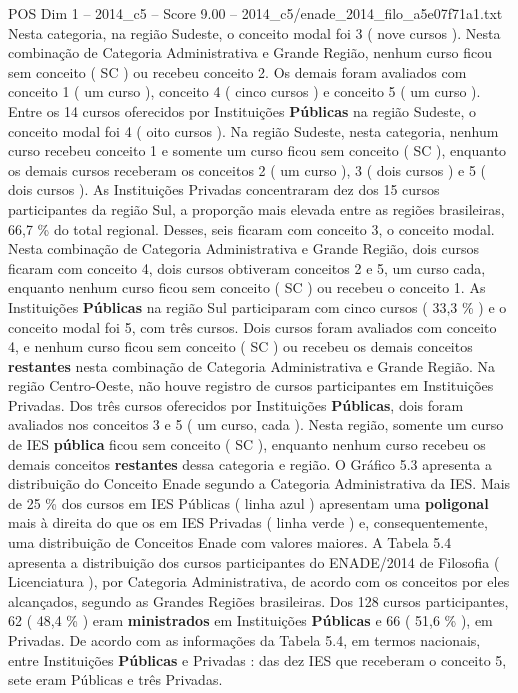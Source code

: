 \begin{textsample}{POS Dim 1 – 2014\_c5 – Score 9.00 – 2014\_c5/enade\_2014\_filo\_a5e07f71a1.txt}
Nesta categoria, na região Sudeste, o conceito modal foi 3 ( nove cursos ).
Nesta combinação de Categoria Administrativa e Grande Região, nenhum curso ficou sem conceito ( SC ) ou recebeu conceito 2.
Os demais foram avaliados com conceito 1 ( um curso ), conceito 4 ( cinco cursos ) e conceito 5 ( um curso ).
Entre os 14 cursos oferecidos por Instituições \textbf{Públicas} na região Sudeste, o conceito modal foi 4 ( oito cursos ).
Na região Sudeste, nesta categoria, nenhum curso recebeu conceito 1 e somente um curso ficou sem conceito ( SC ), enquanto os demais cursos receberam os conceitos 2 ( um curso ), 3 ( dois cursos ) e 5 ( dois cursos ).
As Instituições Privadas concentraram dez dos 15 cursos participantes da região Sul, a proporção mais elevada entre as regiões brasileiras, 66,7 \% do total regional.
Desses, seis ficaram com conceito 3, o conceito modal.
Nesta combinação de Categoria Administrativa e Grande Região, dois cursos ficaram com conceito 4, dois cursos obtiveram conceitos 2 e 5, um curso cada, enquanto nenhum curso ficou sem conceito ( SC ) ou recebeu o conceito 1.
As Instituições \textbf{Públicas} na região Sul participaram com cinco cursos ( 33,3 \% ) e o conceito modal foi 5, com três cursos.
Dois cursos foram avaliados com conceito 4, e nenhum curso ficou sem conceito ( SC ) ou recebeu os demais conceitos \textbf{restantes} nesta combinação de Categoria Administrativa e Grande Região.
Na região Centro-Oeste, não houve registro de cursos participantes em Instituições Privadas.
Dos três cursos oferecidos por Instituições \textbf{Públicas}, dois foram avaliados nos conceitos 3 e 5 ( um curso, cada ).
Nesta região, somente um curso de IES \textbf{pública} ficou sem conceito ( SC ), enquanto nenhum curso recebeu os demais conceitos \textbf{restantes} dessa categoria e região.
O Gráfico 5.3 apresenta a distribuição do Conceito Enade segundo a Categoria Administrativa da IES.
Mais de 25 \% dos cursos em IES Públicas ( linha azul ) apresentam uma \textbf{poligonal} mais à direita do que os em IES Privadas ( linha verde ) e, consequentemente, uma distribuição de Conceitos Enade com valores maiores.
A Tabela 5.4 apresenta a distribuição dos cursos participantes do ENADE/2014 de Filosofia ( Licenciatura ), por Categoria Administrativa, de acordo com os conceitos por eles alcançados, segundo as Grandes Regiões brasileiras.
Dos 128 cursos participantes, 62 ( 48,4 \% ) eram \textbf{ministrados} em Instituições \textbf{Públicas} e 66 ( 51,6 \% ), em Privadas.
De acordo com as informações da Tabela 5.4, em termos nacionais, entre Instituições \textbf{Públicas} e Privadas : das dez IES que receberam o conceito 5, sete eram Públicas e três Privadas.

\end{textsample}
